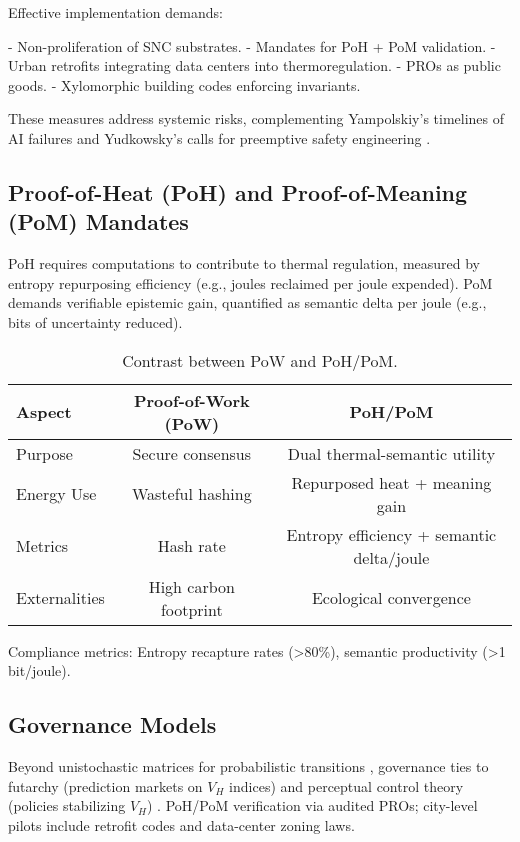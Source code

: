 \documentclass[12pt]{article}
\begin{document}
Effective implementation demands:

- Non-proliferation of SNC substrates.
- Mandates for PoH + PoM validation.
- Urban retrofits integrating data centers into thermoregulation.
- PROs as public goods.
- Xylomorphic building codes enforcing invariants.

These measures address systemic risks, complementing Yampolskiy's timelines of AI failures and Yudkowsky's calls for preemptive safety engineering \citep{Yampolskiy2020,Yudkowsky2004}.

\subsection{Proof-of-Heat (PoH) and Proof-of-Meaning (PoM) Mandates}

PoH requires computations to contribute to thermal regulation, measured by entropy repurposing efficiency (e.g., joules reclaimed per joule expended). PoM demands verifiable epistemic gain, quantified as semantic delta per joule (e.g., bits of uncertainty reduced).

\begin{table}[h]
\centering
\begin{tabular}{lcc}
\toprule
Aspect & Proof-of-Work (PoW) & PoH/PoM \\
\midrule
Purpose & Secure consensus & Dual thermal-semantic utility \\
Energy Use & Wasteful hashing & Repurposed heat + meaning gain \\
Metrics & Hash rate & Entropy efficiency + semantic delta/joule \\
Externalities & High carbon footprint & Ecological convergence \\
\bottomrule
\end{tabular}
\caption{Contrast between PoW and PoH/PoM.}
\label{tab:pow-vs-pohpom}
\end{table}

Compliance metrics: Entropy recapture rates (>80\%), semantic productivity (>1 bit/joule).

\subsection{Governance Models}

Beyond unistochastic matrices for probabilistic transitions \citep{ZyczkowskiSlomczynskiKusSommers2003}, governance ties to futarchy (prediction markets on $V_H$ indices) \citep{Hanson2003} and perceptual control theory (policies stabilizing $V_H$) \citep{Powers2005}. PoH/PoM verification via audited PROs; city-level pilots include retrofit codes and data-center zoning laws.
\end{document}
